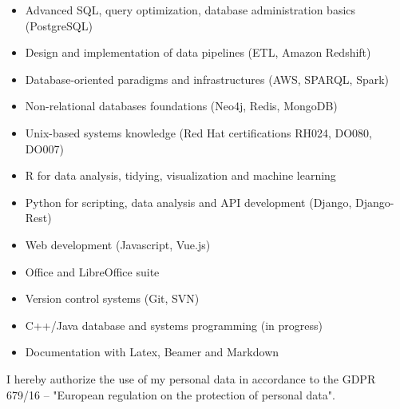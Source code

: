 \documentclass[10pt, a4paper, roman]{moderncv}        %
\begin{document}
	\begin{itemize}
		
		\item Advanced SQL, query optimization, database administration basics (PostgreSQL)
		
		\vspace{1pt}
		
		\item Design and implementation of data pipelines (ETL, Amazon Redshift)
		
		\vspace{1pt}
		
		\item Database-oriented paradigms and infrastructures (AWS, SPARQL, Spark)
		
		\vspace{1pt}
		
		\item Non-relational databases foundations (Neo4j, Redis, MongoDB)
		
		\vspace{1pt}
		
		\item Unix-based systems knowledge (Red Hat certifications RH024, DO080, DO007)
		
		\vspace{1pt}
		
		\item R for data analysis, tidying, visualization and machine learning
		
		\vspace{1pt}
		
		\item Python for scripting, data analysis and API development (Django, Django-Rest)
		
		\vspace{1pt}
		
		\item Web development (Javascript, Vue.js)
		
		\vspace{1pt}
		
		\item Office and LibreOffice suite
		
		\vspace{1pt}
		
		\item Version control systems (Git, SVN)
		
		\vspace{1pt}
		
		\item C++/Java database and systems programming (in progress)
		
		\vspace{1pt}
		
		\item Documentation with Latex, Beamer and Markdown
		
	\end{itemize}
	
	\vspace{55pt}
	I hereby authorize the use of my personal data in accordance to the GDPR 679/16 – "European regulation on the protection of personal data".
	
\end{document}
